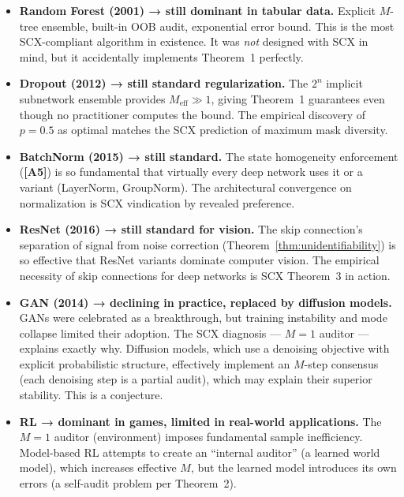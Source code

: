 \documentclass[12pt,a4paper]{article}
\theoremstyle{definition}
\newcommand{\SCX}{\textsc{SCX}}
\newcommand{\asmTag}[1]{\textsf{\textbf{[A#1]}}}
\begin{document}
\begin{itemize}
    \item \textbf{Random Forest (2001) → still dominant in tabular data.} Explicit $M$-tree ensemble, built-in OOB audit, exponential error bound. This is the most \SCX{}-compliant algorithm in existence. It was \emph{not} designed with \SCX{} in mind, but it accidentally implements Theorem~1 perfectly.

    \item \textbf{Dropout (2012) → still standard regularization.} The $2^n$ implicit subnetwork ensemble provides $M_{\text{eff}} \gg 1$, giving Theorem~1 guarantees even though no practitioner computes the bound. The empirical discovery of $p=0.5$ as optimal matches the \SCX{} prediction of maximum mask diversity.

    \item \textbf{BatchNorm (2015) → still standard.} The state homogeneity enforcement (\asmTag{5}) is so fundamental that virtually every deep network uses it or a variant (LayerNorm, GroupNorm). The architectural convergence on normalization is \SCX{} vindication by revealed preference.

    \item \textbf{ResNet (2016) → still standard for vision.} The skip connection's separation of signal from noise correction (Theorem~\ref{thm:unidentifiability}) is so effective that ResNet variants dominate computer vision. The empirical necessity of skip connections for deep networks is \SCX{} Theorem~3 in action.

    \item \textbf{GAN (2014) → declining in practice, replaced by diffusion models.} GANs were celebrated as a breakthrough, but training instability and mode collapse limited their adoption. The \SCX{} diagnosis — $M=1$ auditor — explains exactly why. Diffusion models, which use a denoising objective with explicit probabilistic structure, effectively implement an $M$-step consensus (each denoising step is a partial audit), which may explain their superior stability. This is a conjecture.

    \item \textbf{RL → dominant in games, limited in real-world applications.} The $M=1$ auditor (environment) imposes fundamental sample inefficiency. Model-based RL attempts to create an ``internal auditor'' (a learned world model), which increases effective $M$, but the learned model introduces its own errors (a self-audit problem per Theorem~2).
\end{itemize}
\end{document}
